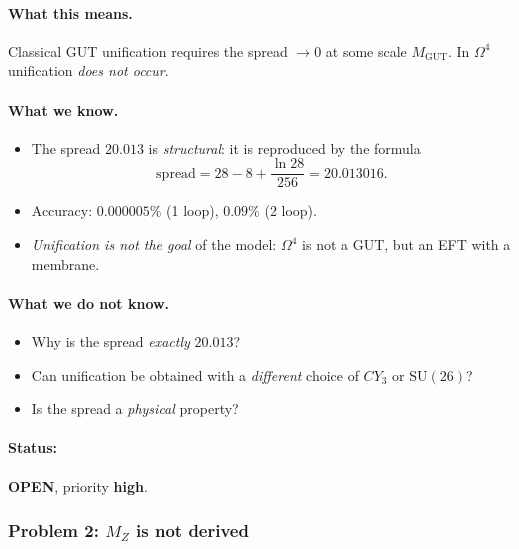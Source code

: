 \documentclass[11pt,a4paper]{article}
\newcommand{\SU}{\mathrm{SU}}
\newcommand{\CY}{CY_3}
\newcommand{\Om}{\Omega^4}
\theoremstyle{definition}
\begin{document}
\paragraph{What this means.}
Classical GUT unification requires the spread $\to 0$ at 
some scale $M_{\text{GUT}}$. In $\Om$ unification 
\emph{does not occur}.

\paragraph{What we know.}
\begin{itemize}
    \item The spread $20.013$ is \emph{structural}: it is reproduced 
          by the formula
          \begin{equation}
              \text{spread} = 28 - 8 + \frac{\ln 28}{256} 
              = 20.013016.
          \end{equation}
    \item Accuracy: $0.000005\%$ (1 loop), $0.09\%$ (2 loop).
    \item \emph{Unification is not the goal} of the model: 
          $\Om$ is not a GUT, but an EFT with a membrane.
\end{itemize}

\paragraph{What we do not know.}
\begin{itemize}
    \item Why is the spread \emph{exactly} $20.013$?
    \item Can unification be obtained with a \emph{different} 
          choice of $\CY$ or $\SU(26)$?
    \item Is the spread a \emph{physical} property?
\end{itemize}

\paragraph{Status:} \textbf{OPEN}, priority \textbf{high}.

\subsubsection{Problem 2: $M_Z$ is not derived}
\end{document}
